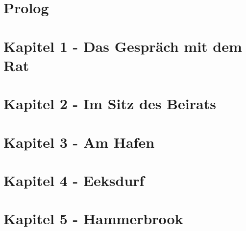 
\section{\textbf{Prolog}}


\section{\textbf{Kapitel 1 - Das Gespräch mit dem Rat}}



\section{\textbf{Kapitel 2 - Im Sitz des Beirats}}



\section{\textbf{Kapitel 3 - Am Hafen}}
\label{Hafen}


\section{\textbf{Kapitel 4 - Eeksdurf}}
\label{xd}


\section{\textbf{Kapitel 5 - Hammerbrook}}
\label{arm}

